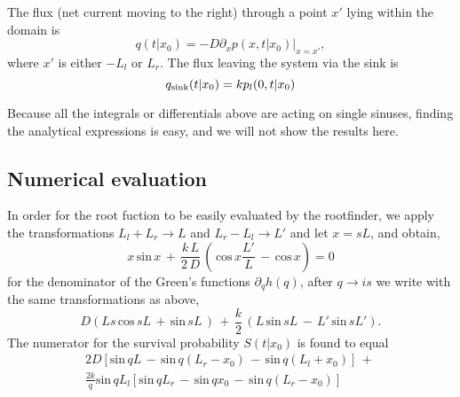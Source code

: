 The flux (net current moving to the right) through a point $x'$ lying within the domain is
\begin{equation}
 q(t|x_0) = -D \left. \partial_x p(x,t|x_0) \right|_{x = x'},
\end{equation}
where $x'$ is either $-L_l$ or $L_r$. The flux leaving the system via the sink is
\begin{equation}
 q_{\rm sink}(t|x_0) = k p_l(0,t|x_0)
\end{equation}

Because all the integrals or differentials above are acting on single sinuses, finding the analytical expressions is easy, and we will not show the results here.

\subsection{ Numerical evaluation}

In order for the root fuction to be easily evaluated by the rootfinder, we apply the transformations $L_l + L_r \rightarrow L$ and $L_r - L_l \rightarrow L'$ and let $x = s L$, and obtain,
\begin{equation}
 x \, \mathrm{sin} \, x \, + \, \frac{k \, L}{2 \, D} \, \left( \, \mathrm{cos} \, x \frac{L'}{L} \, - \, \mathrm{cos} \, x \right) = 0
\end{equation}
for the denominator of the Green's functions $\partial_q h(q)$, after $q \rightarrow i s$ we write with the same transformations as above,
\begin{equation}
 D \left( L s \, \mathrm{cos} \, s L \, + \, \mathrm{sin} \, s L \, \right) \, + \, \frac{k}{2} \, \left( L \, \mathrm{sin} \, s L \, - \, L' \, \mathrm{sin} \, s L' \right).
\end{equation}
The numerator for the survival probability $S(t|x_0)$ is found to equal
\begin{multline}
2 D \left[ \mathrm{sin} \, q L \, - \, \mathrm{sin} \, q (L_r - x_0) \, - \, \mathrm{sin} \, q (L_l + x_0)  \right] \, + \, \\ 
 \frac{2 k}{q} \mathrm{sin} \, q L_l \left[ \mathrm{sin} \, q L_r \, - \, \mathrm{sin} \, q x_0 \, - \, \mathrm{sin} \, q (L_r - x_0) \right] 
\end{multline}